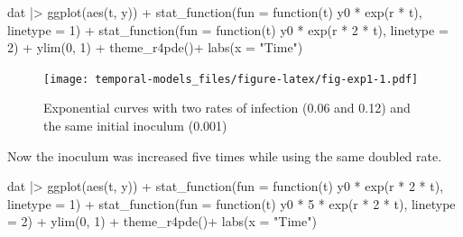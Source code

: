 \documentclass[
  letterpaper,
]{book}
\newenvironment{Shaded}{\begin{snugshade}}{\end{snugshade}}
\newcommand{\AttributeTok}[1]{\textcolor[rgb]{0.40,0.45,0.13}{#1}}
\newcommand{\ControlFlowTok}[1]{\textcolor[rgb]{0.00,0.23,0.31}{#1}}
\newcommand{\DecValTok}[1]{\textcolor[rgb]{0.68,0.00,0.00}{#1}}
\newcommand{\FunctionTok}[1]{\textcolor[rgb]{0.28,0.35,0.67}{#1}}
\newcommand{\NormalTok}[1]{\textcolor[rgb]{0.00,0.23,0.31}{#1}}
\newcommand{\SpecialCharTok}[1]{\textcolor[rgb]{0.37,0.37,0.37}{#1}}
\newcommand{\StringTok}[1]{\textcolor[rgb]{0.13,0.47,0.30}{#1}}
\begin{document}
\begin{Shaded}
\begin{Highlighting}[]
\NormalTok{dat }\SpecialCharTok{|\textgreater{}}
  \FunctionTok{ggplot}\NormalTok{(}\FunctionTok{aes}\NormalTok{(t, y)) }\SpecialCharTok{+}
  \FunctionTok{stat\_function}\NormalTok{(}\AttributeTok{fun =} \ControlFlowTok{function}\NormalTok{(t) y0 }\SpecialCharTok{*} \FunctionTok{exp}\NormalTok{(r }\SpecialCharTok{*}\NormalTok{ t), }\AttributeTok{linetype =} \DecValTok{1}\NormalTok{) }\SpecialCharTok{+}
  \FunctionTok{stat\_function}\NormalTok{(}\AttributeTok{fun =} \ControlFlowTok{function}\NormalTok{(t) y0 }\SpecialCharTok{*} \FunctionTok{exp}\NormalTok{(r }\SpecialCharTok{*} \DecValTok{2} \SpecialCharTok{*}\NormalTok{ t), }\AttributeTok{linetype =} \DecValTok{2}\NormalTok{) }\SpecialCharTok{+}
  \FunctionTok{ylim}\NormalTok{(}\DecValTok{0}\NormalTok{, }\DecValTok{1}\NormalTok{) }\SpecialCharTok{+}
  \FunctionTok{theme\_r4pde}\NormalTok{()}\SpecialCharTok{+}
  \FunctionTok{labs}\NormalTok{(}\AttributeTok{x =} \StringTok{"Time"}\NormalTok{)}
\end{Highlighting}
\end{Shaded}

\begin{figure}

\texttt{[image: temporal-models\_files/figure-latex/fig-exp1-1.pdf]} \hfill{}

\caption{\label{fig-exp1}Exponential curves with two rates of infection
(0.06 and 0.12) and the same initial inoculum (0.001)}

\end{figure}

Now the inoculum was increased five times while using the same doubled
rate.

\begin{Shaded}
\begin{Highlighting}[]
\NormalTok{dat }\SpecialCharTok{|\textgreater{}}
  \FunctionTok{ggplot}\NormalTok{(}\FunctionTok{aes}\NormalTok{(t, y)) }\SpecialCharTok{+}
  \FunctionTok{stat\_function}\NormalTok{(}\AttributeTok{fun =} \ControlFlowTok{function}\NormalTok{(t) y0 }\SpecialCharTok{*} \FunctionTok{exp}\NormalTok{(r }\SpecialCharTok{*} \DecValTok{2} \SpecialCharTok{*}\NormalTok{ t), }\AttributeTok{linetype =} \DecValTok{1}\NormalTok{) }\SpecialCharTok{+}
  \FunctionTok{stat\_function}\NormalTok{(}\AttributeTok{fun =} \ControlFlowTok{function}\NormalTok{(t) y0 }\SpecialCharTok{*} \DecValTok{5} \SpecialCharTok{*} \FunctionTok{exp}\NormalTok{(r }\SpecialCharTok{*} \DecValTok{2} \SpecialCharTok{*}\NormalTok{ t), }\AttributeTok{linetype =} \DecValTok{2}\NormalTok{) }\SpecialCharTok{+}
  \FunctionTok{ylim}\NormalTok{(}\DecValTok{0}\NormalTok{, }\DecValTok{1}\NormalTok{) }\SpecialCharTok{+}
  \FunctionTok{theme\_r4pde}\NormalTok{()}\SpecialCharTok{+}
  \FunctionTok{labs}\NormalTok{(}\AttributeTok{x =} \StringTok{"Time"}\NormalTok{)}
\end{Highlighting}
\end{Shaded}
\end{document}
